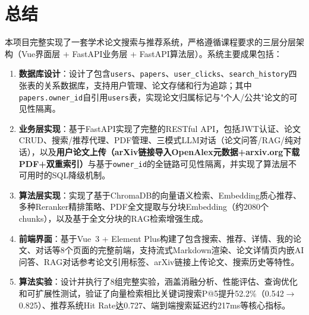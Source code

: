 \documentclass[12pt,a4paper]{ctexart}
\newcommand{\code}[1]{\texttt{#1}}
\begin{document}
\section{总结}

本项目完整实现了一套学术论文搜索与推荐系统，严格遵循课程要求的三层分层架构（Vue界面层 + FastAPI业务层 + FastAPI算法层）。系统主要成果包括：

\begin{enumerate}
\item \textbf{数据库设计}：设计了包含\code{users}、\code{papers}、\code{user\_clicks}、\code{search\_history}四张表的关系数据库，支持用户管理、论文存储和行为追踪；其中\code{papers.owner\_id}自引用\code{users}表，实现论文归属标记与"个人/公共"论文的可见性隔离。

\item \textbf{业务层实现}：基于FastAPI实现了完整的RESTful API，包括JWT认证、论文CRUD、搜索/推荐代理、PDF管理、三模式LLM对话（论文问答/RAG/纯对话），以及\textbf{用户论文上传（arXiv链接导入OpenAlex元数据+arxiv.org下载PDF+双重索引）}与基于\code{owner\_id}的全链路可见性隔离，并实现了算法层不可用时的SQL降级机制。

\item \textbf{算法层实现}：实现了基于ChromaDB的向量语义检索、Embedding质心推荐、多种Reranker精排策略、PDF全文提取与分块Embedding（约2080个chunks），以及基于全文分块的RAG检索增强生成。

\item \textbf{前端界面}：基于Vue~3 + Element Plus构建了包含搜索、推荐、详情、我的论文、对话等8个页面的完整前端，支持流式Markdown渲染、论文详情页内嵌AI问答、RAG对话参考论文引用标签、arXiv链接上传论文、搜索历史等特性。

\item \textbf{算法实验}：设计并执行了8组完整实验，涵盖消融分析、性能评估、查询优化和可扩展性测试，验证了向量检索相比关键词搜索P@5提升52.2\%（0.542$\to$0.825）、推荐系统Hit Rate达0.727、端到端搜索延迟约217ms等核心指标。
\end{enumerate}
\end{document}
